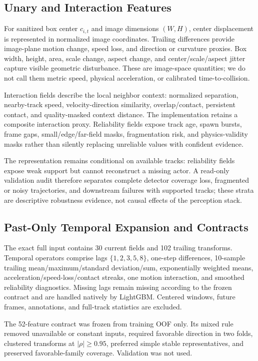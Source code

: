\documentclass[letterpaper]{article}
\begin{document}
\subsection{Unary and Interaction Features}
For sanitized box center $c_{i,t}$ and image dimensions $(W,H)$, center displacement is represented in normalized image coordinates. Trailing differences provide image-plane motion change, speed loss, and direction or curvature proxies. Box width, height, area, scale change, aspect change, and center/scale/aspect jitter capture visible geometric disturbance. These are image-space quantities; we do not call them metric speed, physical acceleration, or calibrated time-to-collision.

Interaction fields describe the local neighbor context: normalized separation, nearby-track speed, velocity-direction similarity, overlap/contact, persistent contact, and quality-masked context distance. The implementation retains a composite interaction proxy. Reliability fields expose track age, spawn bursts, frame gaps, small/edge/far-field masks, fragmentation risk, and physics-validity masks rather than silently replacing unreliable values with confident evidence.

The representation remains conditional on available tracks: reliability fields expose weak support but cannot reconstruct a missing actor. A read-only validation audit therefore separates complete detector coverage loss, fragmented or noisy trajectories, and downstream failures with supported tracks; these strata are descriptive robustness evidence, not causal effects of the perception stack.

\subsection{Past-Only Temporal Expansion and Contracts}
The exact full input contains 30 current fields and 102 trailing transforms. Temporal operators comprise lags $\{1,2,3,5,8\}$, one-step differences, 10-sample trailing mean/maximum/standard deviation/sum, exponentially weighted means, acceleration/speed-loss/contact streaks, one motion interaction, and smoothed reliability diagnostics. Missing lags remain missing according to the frozen contract and are handled natively by LightGBM. Centered windows, future frames, annotations, and full-track statistics are excluded.

The 52-feature contract was frozen from training OOF only. Its mixed rule removed unavailable or constant inputs, required favorable direction in two folds, clustered transforms at $|\rho|\geq0.95$, preferred simple stable representatives, and preserved favorable-family coverage. Validation was not used.
\end{document}
